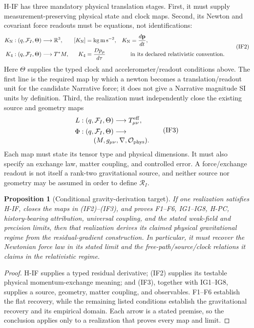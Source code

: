 \documentclass[11pt,a4paper]{article}
\newtheorem{proposition}[definition]{Proposition}
\theoremstyle{remark}
\newcommand{\Obs}{\mathcal O}
\begin{document}
H-IF has three mandatory physical translation stages. First, it must supply
measurement-preserving physical state and clock maps. Second, its Newton and
covariant force readouts must be equations, not identifications:
\[
\begin{aligned}
 K_{\rm N}&:(q,\mathcal F_I,\Theta)\longrightarrow\mathbb R^3,
 & [K_{\rm N}]&=\mathrm{kg\,m\,s^{-2}},
 &K_{\rm N}&=\frac{d\mathbf p}{dt},\\
 K_4&:(q,\mathcal F_I,\Theta)\longrightarrow T^*M,
 &K_4&=\frac{Dp_\mu}{d\tau}
 &&\text{in its declared relativistic convention}.
\end{aligned}\tag{IF2}
\]
Here $\Theta$ supplies the typed clock and accelerometer/readout conditions
above. The first line is the required map by which a newton becomes a
translation/readout unit for the candidate Narrative force; it does not give a
Narrative magnitude SI units by definition. Third, the realization must
independently close the existing source and geometry maps
\[
\begin{aligned}
 L&:(q,\mathcal F_I,\Theta)\longrightarrow T^{\rm eff}_{\mu\nu},\\
 \Phi&:(q,\mathcal F_I,\Theta)\longrightarrow\\[-2pt]
 &\qquad(M,g_{\mu\nu},\nabla,\Obs_{\rm phys}).
\end{aligned}\tag{IF3}
\]
Each map must state its tensor type and physical dimensions. It must also
specify an exchange law, matter coupling, and controlled error. A
force/exchange readout is not itself a rank-two gravitational source, and
neither source nor geometry may be assumed in order to define
$\mathcal R_I$.

\begin{proposition}[Conditional gravity-derivation target]\label{prop:ifrecovery}
If one realization satisfies H-IF, closes the maps in (IF2)--(IF3), and proves
F1--F6, IG1--IG8, H-PC, history-bearing attribution, universal coupling, and the
stated weak-field and precision limits, then that realization derives its
claimed physical gravitational regime from the residual-gradient construction.
In particular, it must recover the Newtonian force law in its stated limit and
the free-path/source/clock relations it claims in the relativistic regime.
\end{proposition}
\begin{proof}
H-IF supplies a typed residual derivative; (IF2) supplies its testable physical
momentum-exchange meaning; and (IF3), together with IG1--IG8, supplies a source,
geometry, matter coupling, and observables. F1--F6 establish the flat recovery,
while the remaining listed conditions establish the gravitational recovery and
its empirical domain. Each arrow is a stated premise, so the conclusion applies
only to a realization that proves every map and limit.
\end{proof}
\end{document}
